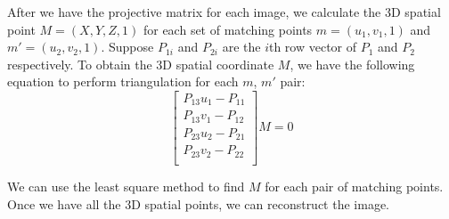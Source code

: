 After we have the projective matrix for each image, we calculate the 3D spatial point $M = (X, Y, Z, 1)$ for each set of matching points $m = (u_1, v_1, 1)$ and $m' = (u_2, v_2, 1)$. Suppose $P_{1i}$ and $P_{2i}$ are the $i$th row vector of $P_1$ and $P_2$ respectively. To obtain the 3D spatial coordinate $M$, we have the following equation to perform triangulation for each $m$, $m'$ pair:
\begin{equation*}
  \left[ {\begin{array}{c}
   P_{13}u_1 - P_{11} \\
   P_{13}v_1 - P_{12} \\
   P_{23}u_2 - P_{21} \\
   P_{23}v_2 - P_{22} \\
  \end{array} } \right] M = 0
\end{equation*}

We can use the least square method to find $M$ for each pair of matching points. Once we have all the 3D spatial points, we can reconstruct the image.